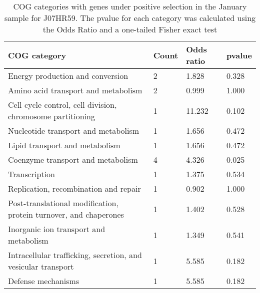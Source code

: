 \begin{table}[]
\footnotesize 
	\tabcolsep=0.11cm 
\caption{COG categories with genes under positive selection in the January sample for J07HR59. The pvalue for each category was calculated using the Odds Ratio and a one-tailed Fisher exact test} 
\begin{tabularx}{\textwidth}{L{6cm}R{2cm}R{2cm}R{2cm}} 
\hline 
\textbf{COG category} & \textbf{Count} & \textbf{Odds ratio} & \textbf{pvalue} \\ 
\hline 
Energy production and conversion & 2 & 1.828 & 0.328 \\ 
Amino acid transport and metabolism & 2 & 0.999 & 1.000 \\ 
Cell cycle control, cell division, chromosome partitioning & 1 & 11.232 & 0.102 \\ 
Nucleotide transport and metabolism & 1 & 1.656 & 0.472 \\ 
Lipid transport and metabolism & 1 & 1.656 & 0.472 \\ 
Coenzyme transport and metabolism & 4 & 4.326 & 0.025 \\ 
Transcription & 1 & 1.375 & 0.534 \\ 
Replication, recombination and repair & 1 & 0.902 & 1.000 \\ 
Post-translational modification, protein turnover, and chaperones & 1 & 1.402 & 0.528 \\ 
Inorganic ion transport and metabolism & 1 & 1.349 & 0.541 \\ 
Intracellular trafficking, secretion, and vesicular transport & 1 & 5.585 & 0.182 \\ 
Defense mechanisms & 1 & 5.585 & 0.182 \\ 
\end{tabularx} 
\label{January_COG_Selection_J07HR59} 
 \end{table} 

